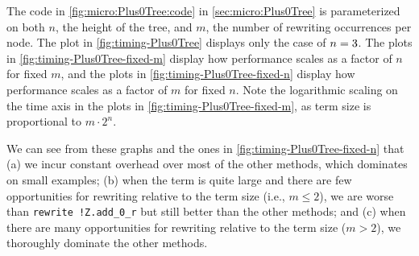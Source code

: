 \documentclass[a4paper,USenglish,cleveref,autoref,thm-restate]{lipics-v2021}
\begin{document}
\begin{minipage}[t][1cm]{\textwidth}

The code in \autoref{fig:micro:Plus0Tree:code} in \autoref{sec:micro:Plus0Tree} is parameterized on both $n$, the height of the tree, and $m$, the number of rewriting occurrences per node.
The plot in \autoref{fig:timing-Plus0Tree} displays only the case of $n=3$.
The plots in \autoref{fig:timing-Plus0Tree-fixed-m} display how performance scales as a factor of $n$ for fixed $m$, and the plots in \autoref{fig:timing-Plus0Tree-fixed-n} display how performance scales as a factor of $m$ for fixed $n$.
Note the logarithmic scaling on the time axis in the plots in \autoref{fig:timing-Plus0Tree-fixed-m}, as term size is proportional to $m\cdot 2^n$.

We can see from these graphs and the ones in \autoref{fig:timing-Plus0Tree-fixed-n} that
(a) we incur constant overhead over most of the other methods, which dominates on small examples;
(b) when the term is quite large and there are few opportunities for rewriting relative to the term size (i.e., $m \le 2$), we are worse than \texttt{rewrite !Z.add_0_r} but still better than the other methods; and
(c) when there are many opportunities for rewriting relative to the term size ($m > 2$), we thoroughly dominate the other methods.


\end{minipage}
\end{document}
